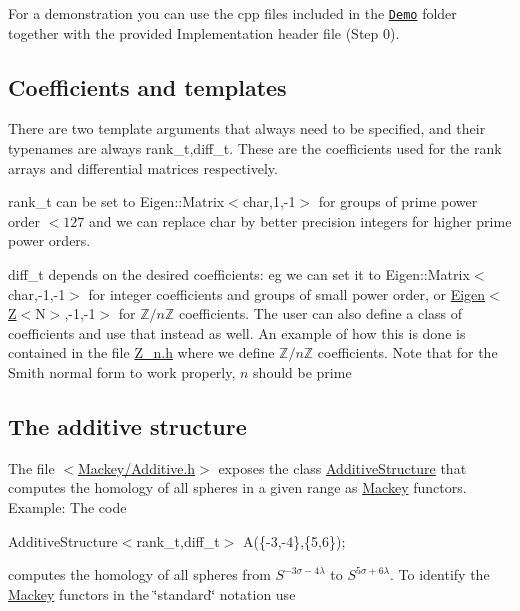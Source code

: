 For a demonstration you can use the cpp files included in the \href{https://github.com/NickG-Math/Mackey/tree/master/Demo}{\tt Demo} folder together with the provided Implementation header file (Step 0).\hypertarget{use_coeff}{}\subsection{Coefficients and templates}\label{use_coeff}
There are two template arguments that always need to be specified, and their typenames are always {\ttfamily rank\+\_\+t,diff\+\_\+t}. These are the coefficients used for the rank arrays and differential matrices respectively.


\begin{DoxyItemize}
\item {\ttfamily rank\+\_\+t} can be set to {\ttfamily Eigen\+::\+Matrix$<$char,1,-\/1$>$} for groups of prime power order $<127$ and we can replace {\ttfamily char} by better precision integers for higher prime power orders.
\item {\ttfamily diff\+\_\+t} depends on the desired coefficients\+: eg we can set it to {\ttfamily Eigen\+::\+Matrix$<$char,-\/1,-\/1$>$} for integer coefficients and groups of small power order, or {\ttfamily \hyperlink{namespaceEigen}{Eigen}$<$\hyperlink{classZ}{Z}$<$N$>$,-\/1,-\/1$>$} for $\mathbb Z/n\mathbb Z$ coefficients. The user can also define a class of coefficients and use that instead as well. An example of how this is done is contained in the file {\ttfamily \hyperlink{Z__n_8h}{Z\+\_\+n.\+h}} where we define $\mathbb Z/n\mathbb Z$ coefficients. Note that for the Smith normal form to work properly, $n$ should be prime
\end{DoxyItemize}\hypertarget{use_step1add}{}\subsection{The additive structure}\label{use_step1add}
The file {\ttfamily $<$\hyperlink{Additive_8h}{Mackey/\+Additive.\+h}$>$} exposes the class \hyperlink{classMackey_1_1AdditiveStructure}{Additive\+Structure} that computes the homology of all spheres in a given range as \hyperlink{namespaceMackey}{Mackey} functors. Example\+: The code

{\ttfamily  Additive\+Structure$<$rank\+\_\+t,diff\+\_\+t$>$ A(\{-\/3,-\/4\},\{5,6\}); }

computes the homology of all spheres from $S^{-3\sigma-4\lambda}$ to $S^{5\sigma+6\lambda}$. To identify the \hyperlink{namespaceMackey}{Mackey} functors in the \char`\"{}standard\char`\"{} notation use

